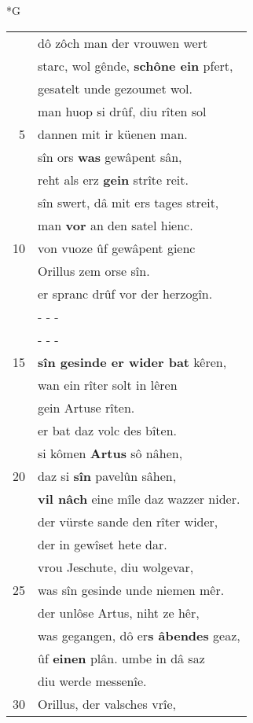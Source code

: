 \documentclass[8pt,a4paper,notitlepage]{article}
\begin{document}
\begin{table}[ht]
\begin{minipage}[t]{0.5\linewidth}
\small
\begin{center}*G
\end{center}
\begin{tabular}{rl}
 & dô zôch man der vrouwen wert\\ 
 & starc, wol gênde, \textbf{schône ein} pfert,\\ 
 & gesatelt unde gezoumet wol.\\ 
 & man huop si drûf, diu rîten sol\\ 
5 & dannen mit ir küenen man.\\ 
 & sîn ors \textbf{was} gewâpent sân,\\ 
 & reht als erz \textbf{gein} strîte reit.\\ 
 & sîn swert, dâ mit ers tages streit,\\ 
 & man \textbf{vor} an den satel hienc.\\ 
10 & von vuoze ûf gewâpent gienc\\ 
 & Orillus zem orse sîn.\\ 
 & er spranc drûf vor der herzogîn.\\ 
 & \multicolumn{1}{l}{ - - - }\\ 
 & \multicolumn{1}{l}{ - - - }\\ 
15 & \textbf{sîn gesinde er wider bat} kêren,\\ 
 & wan ein rîter solt in lêren\\ 
 & gein Artuse rîten.\\ 
 & er bat daz volc des bîten.\\ 
 & si kômen \textbf{Artus} sô nâhen,\\ 
20 & daz si \textbf{sîn} pavelûn sâhen,\\ 
 & \textbf{vil nâch} eine mîle daz wazzer nider.\\ 
 & der vürste sande den rîter wider,\\ 
 & der in gewîset hete dar.\\ 
 & vrou Jeschute, diu wolgevar,\\ 
25 & was sîn gesinde unde niemen mêr.\\ 
 & der unlôse Artus, niht ze hêr,\\ 
 & was gegangen, dô er\textbf{s âbendes} geaz,\\ 
 & ûf \textbf{einen} plân. umbe in dâ saz\\ 
 & diu werde messenîe.\\ 
30 & Orillus, der valsches vrîe,\\ 

\end{tabular}
\end{minipage}
\end{table}
\end{document}
